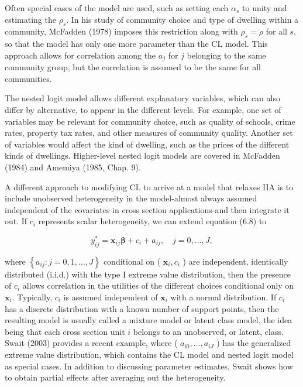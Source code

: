 \documentclass[10pt]{article}
\begin{document}
Often special cases of the model are used, such as setting each $\alpha_{s}$ to unity and estimating the $\rho_{s}$. In his study of community choice and type of dwelling within a community, McFadden (1978) imposes this restriction along with $\rho_{s}=\rho$ for all $s$, so that the model has only one more parameter than the CL model. This approach allows for correlation among the $a_{j}$ for $j$ belonging to the same community group, but the correlation is assumed to be the same for all communities.

The nested logit model allows different explanatory variables, which can also differ by alternative, to appear in the different levels. For example, one set of variables may be relevant for community choice, such as quality of schools, crime rates, property tax rates, and other measures of community quality. Another set of variables would affect the kind of dwelling, such as the prices of the different kinds of dwellings. Higher-level nested logit models are covered in McFadden (1984) and Amemiya (1985, Chap. 9).

A different approach to modifying CL to arrive at a model that relaxes IIA is to include unobserved heterogeneity in the model-almost always assumed independent of the covariates in cross section applications-and then integrate it out. If $c_{i}$ represents scalar heterogeneity, we can extend equation (6.8) to


\begin{equation*}
y_{i j}^{*}=\mathbf{x}_{i j} \boldsymbol{\beta}+c_{i}+a_{i j}, \quad j=0, \ldots, J, \tag{16.13}
\end{equation*}


where $\left\{a_{i j}: j=0,1, \ldots, J\right\}$ conditional on ( $\mathbf{x}_{i}, c_{i}$ ) are independent, identically distributed (i.i.d.) with the type I extreme value distribution, then the presence of $c_{i}$ allows correlation in the utilities of the different choices conditional only on $\mathbf{x}_{i}$. Typically, $c_{i}$ is assumed independent of $\mathbf{x}_{i}$ with a normal distribution. If $c_{i}$ has a discrete distribution with a known number of support points, then the resulting model is usually called a mixture model or latent class model, the idea being that each cross section unit $i$ belongs to an unobserved, or latent, class. Swait (2003) provides a recent example, where ( $a_{i 0}, \ldots, a_{i J}$ ) has the generalized extreme value distribution, which contains the CL model and nested logit model as special cases. In addition to discussing parameter estimates, Swait shows how to obtain partial effects after averaging out the heterogeneity.
\end{document}
